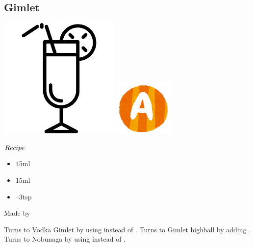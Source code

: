\subsection{Gimlet}
\vspace{-7.4mm}
\hspace{28mm}
\includegraphics[scale=.07]{cocktail_glass_tall.png}
\includegraphics[scale=.12]{capital_a.png}
\vspace{2.5mm}
\begin{itembox}[l]{\boldmath $Recipe$}
\begin{itemize}
\setlength{\parskip}{0cm}
\setlength{\itemsep}{0cm}
\item \gin 45ml
\item \limj 15ml
\item {}--3tsp
\end{itemize}
\vspace{-4mm}
Made by \shake
\end{itembox}
Turns to Vodka Gimlet by using \vodka instead of \gin
\hspace{-1mm}.
Turns to Gimlet highball by adding \soda
\hspace{-1mm}.
Turns to Nobunaga by using \gs instead of \gumsyrup
\hspace{-1mm}.
